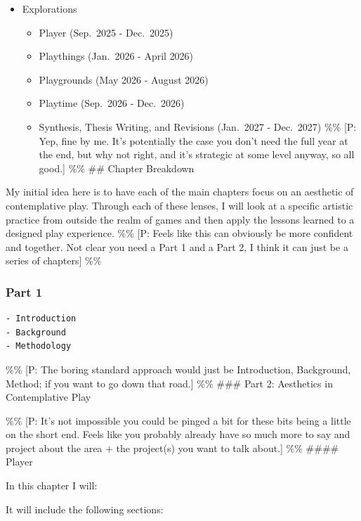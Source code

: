 \documentclass[
]{article}
\providecommand{\tightlist}{%
  \setlength{\itemsep}{0pt}\setlength{\parskip}{0pt}}
\begin{document}
\begin{itemize}
\tightlist
\item
  Explorations

  \begin{itemize}
  \tightlist
  \item
    Player (Sep.~2025 - Dec.~2025)
  \item
    Playthings (Jan.~2026 - April 2026)
  \item
    Playgrounds (May 2026 - August 2026)
  \item
    Playtime (Sep.~2026 - Dec.~2026)
  \item
    Synthesis, Thesis Writing, and Revisions (Jan.~2027 - Dec.~2027)
    \%\% {[}P: Yep, fine by me. It's potentially the case you don't need
    the full year at the end, but why not right, and it's strategic at
    some level anyway, so all good.{]} \%\% \#\# Chapter Breakdown
  \end{itemize}
\end{itemize}

My initial idea here is to have each of the main chapters focus on an
aesthetic of contemplative play. Through each of these lenses, I will
look at a specific artistic practice from outside the realm of games and
then apply the lessons learned to a designed play experience. \%\% {[}P:
Feels like this can obviously be more confident and together. Not clear
you need a Part 1 and a Part 2, I think it can just be a series of
chapters{]} \%\%

\subsubsection{Part 1}\label{part-1}

\begin{verbatim}
- Introduction
- Background
- Methodology
\end{verbatim}

\%\% {[}P: The boring standard approach would just be Introduction,
Background, Method; if you want to go down that road.{]} \%\% \#\#\#
Part 2: Aesthetics in Contemplative Play

\%\% {[}P: It's not impossible you could be pinged a bit for these bits
being a little on the short end. Feels like you probably already have so
much more to say and project about the area + the project(s) you want to
talk about.{]} \%\% \#\#\#\# Player

In this chapter I will:

It will include the following sections:
\end{document}
